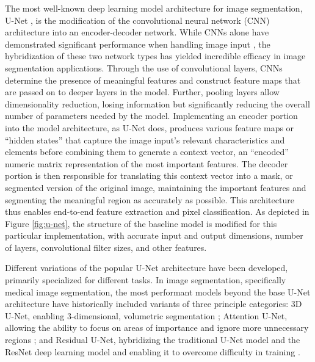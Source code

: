 \documentclass{article}
\begin{document}
\begin{multicols}{2}
The most well-known deep learning model architecture for image segmentation, U-Net \cite{unet_ronneberger2015}, is the modification of the convolutional neural network (CNN) architecture into an encoder-decoder network. While CNNs alone have demonstrated significant performance when handling image input \cite{cnnClassification2012}, the hybridization of these two network types has yielded incredible efficacy in image segmentation applications. Through the use of convolutional layers, CNNs determine the presence of meaningful features and construct feature maps that are passed on to deeper layers in the model. Further, pooling layers allow dimensionality reduction, losing information but significantly reducing the overall number of parameters needed by the model. Implementing an encoder portion into the model architecture, as U-Net does, produces various feature maps or “hidden states” that capture the image input’s relevant characteristics and elements before combining them to generate a context vector, an “encoded” numeric matrix representation of the most important features. The decoder portion is then responsible for translating this context vector into a mask, or segmented version of the original image, maintaining the important features and segmenting the meaningful region as accurately as possible. This architecture thus enables end-to-end feature extraction and pixel classification. As depicted in Figure \ref{fig:u-net},  the structure of the baseline model is modified for this particular implementation, with accurate input and output dimensions, number of layers, convolutional filter sizes, and other features.

Different variations of the popular U-Net architecture have been developed, primarily specialized for different tasks. In image segmentation, specifically medical image segmentation, the most performant models beyond the base U-Net architecture have historically included variants of three principle categories: 3D U-Net, enabling 3-dimensional, volumetric segmentation \cite{3dUnet_2016}; Attention U-Net, allowing the ability to focus on areas of importance and ignore more unnecessary regions \cite{attentionUnet_2018}; and Residual U-Net, hybridizing the traditional U-Net model and the ResNet deep learning model and enabling it to overcome difficulty in training \cite{resUnet_2015}.


\end{multicols}
\end{document}
